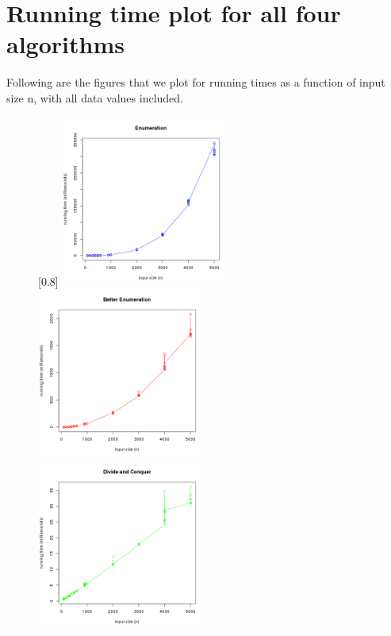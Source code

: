 \documentclass[11pt]{scrreprt}
\begin{document}
\section {Running time plot for all four algorithms}

Following are the figures that we plot for running times as a function of input size n, with all data values included.

\begin{figure}[!htb]
	\captionsetup{singlelinecheck=off}
	\captionsetup[subfigure]{singlelinecheck=on}
	[0.8\textwidth]{%
		\includegraphics[width=0.50\textwidth]{runtime_enumeration.png}%
		\includegraphics[width=0.50\textwidth]{runtime_better_enumeration.png}\\
		\includegraphics[width=0.50\textwidth]{runtime_divide_n_conquer.png}%
}
\end{figure}
\end{document}
